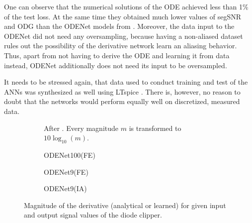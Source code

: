 One can observe that the numerical solutions of the \ac{ODE} achieved less than 1\% of the test loss. At the same time they obtained much lower values of \ac{segSNR} and \ac{ODG} than the ODENet models from . Moreover, the data input to the ODENet did not need any oversampling, because having a non-aliased dataset rules out the possibility of the derivative network learn an aliasing behavior. Thus, apart from not having to derive the \ac{ODE} and learning it from data instead, ODENet additionally does not need its input to be oversampled.

It needs to be stressed again, that data used to conduct training and test of the \acp{ANN} was synthesized as well using LTspice \cite{LTspice}. There is, however, no reason to doubt that the networks would perform equally well on discretized, measured data.

\newcommand{\subfigureWidth}{0.4\textwidth}
\newcommand{\subfigureScale}{0.8}

\begin{figure}
    \centering
    \begin{subfigure}{0.9\textwidth}
        \centering
        \scalebox{\subfigureScale}{}
        \caption{After . Every magnitude $m$ is transformed to $10 \log_{10}(m)$.}
    \end{subfigure}
    \begin{subfigure}{0.9\textwidth}
        \centering
        \scalebox{\subfigureScale}{}
        \caption{ODENet100(FE)}
    \end{subfigure}
    \begin{subfigure}{\subfigureWidth}
        \scalebox{0.75}{}
        \caption{ODENet9(FE)}
    \end{subfigure}
    \begin{subfigure}{\subfigureWidth}
        \scalebox{0.76}{}
        \caption{ODENet9(IA)}
    \end{subfigure}
    \caption{Magnitude of the derivative (analytical or learned) for given input and output signal values of the diode clipper.}
    \label{fig:diode_clipper_derivative_visualizations}
\end{figure}

